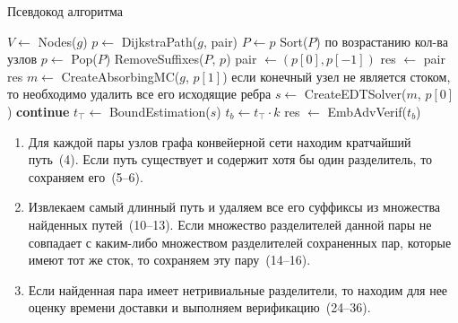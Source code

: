 \documentclass[a4paper]{article}
\begin{document}
\begin{listing}[H]
\caption{Псевдокод алгоритма}\label{alg-desc}
\begin{algorithmic}[1]
    \State $V \gets$ Nodes($g$)
        \State $p \gets$ DijkstraPath($g$, pair)
            \State $P \gets p$
        \EndIf
    \EndFor
    \State
    \State Sort($P$) \Comment по возрастанию кол-ва узлов
        \State $p \gets$ Pop($P$)
        \State RemoveSuffixes($P$, $p$)
        \State pair $\gets (p[0], p[-1])$
        \State res $\gets$ pair
        \EndIf
    \EndWhile
    \State
    \State \Return res
\EndProcedure
\State
{}
        \State $m \gets$ CreateAbsorbingMC($g$, $p[1]$) \Comment если конечный узел не 
        \State \Comment является стоком, то необходимо 
        \State \Comment удалить все его исходящие ребра
        \State $s \gets$ CreateEDTSolver($m$, $p[0]$)
            \State \textbf{continue}
        \EndIf
        \State
        \State $t_{\top} \gets$ BoundEstimation($s$)
            \State $t_b \gets t_{\top} \cdot k$
            \State res $\gets$ EmbAdvVerif($t_b$)
        \EndFor
    \EndFor
\EndProcedure
\end{algorithmic}
\end{listing}


\begin{enumerate}
    \item Для каждой пары узлов графа конвейерной сети находим кратчайший путь~(4).
        Если путь существует и содержит хотя бы один разделитель, то
        сохраняем его~(5--6).

    \item Извлекаем самый длинный путь и удаляем все его суффиксы из множества
        найденных путей~(10--13). Если множество разделителей данной пары не совпадает с
        каким-либо множеством разделителей сохраненных пар, которые имеют тот
        же сток, то сохраняем эту пару~(14--16).

    \item Если найденная пара имеет нетривиальные разделители, то находим для
        нее оценку времени доставки и выполняем верификацию~(24--36).
\end{enumerate}
\end{document}
